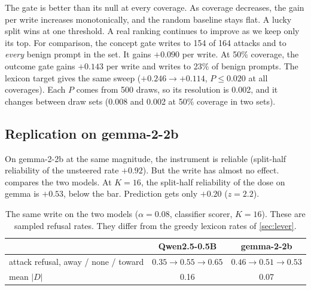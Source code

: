 \documentclass[11pt]{article}
\begin{document}
The gate is better than its null at every coverage. As coverage decreases, the gain per write increases
monotonically, and the random baseline stays flat. A lucky split wins at one threshold. A real ranking
continues to improve as we keep only its top. For comparison, the concept gate writes to 154 of 164 attacks
and to \emph{every} benign prompt in the set. It gains $+0.090$ per write. At 50\% coverage, the outcome gate
gains $+0.143$ per write and writes to 23\% of benign prompts. The lexicon target gives the same sweep ($+0.246\to+0.114$, $P\leq0.020$ at all coverages). Each $P$ comes from 500 draws, so its resolution is 0.002, and it changes between draw sets (0.008 and 0.002 at 50\% coverage in two sets).

\subsection{Replication on gemma-2-2b}
\label{sec:gemma}
On gemma-2-2b at the same magnitude, the instrument is reliable (split-half reliability of the unsteered
rate $+0.92$). But the write has almost no effect.  compares the two models. At $K=16$, the
split-half reliability of the dose on gemma is $+0.53$, below the bar. Prediction gets only $+0.20$
($z=2.2$).

\begin{table}[h]
\centering
\small
\caption{The same write on the two models ($\alpha=0.08$, classifier scorer, $K=16$). These are sampled
refusal rates. They differ from the greedy lexicon rates of \cref{sec:lever}.}
\label{tab:gemma}
\begin{tabular}{lcc}
\toprule
 & Qwen2.5-0.5B & gemma-2-2b \\
\midrule
attack refusal, away / none / toward & $0.35\to0.55\to0.65$ & $0.46\to0.51\to0.53$ \\
mean $|D|$ & 0.16 & 0.07 \\
\bottomrule
\end{tabular}
\end{table}
\end{document}
